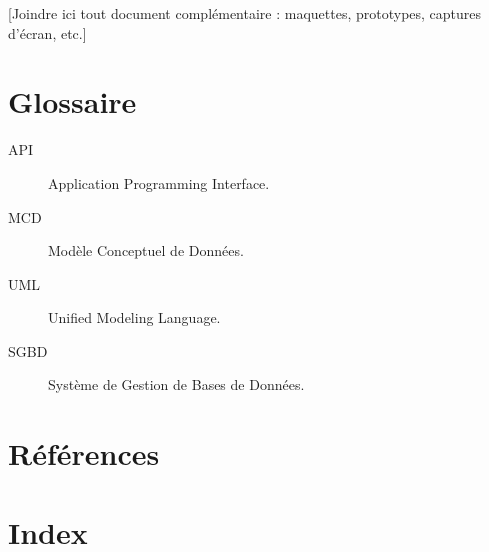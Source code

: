\documentclass[12pt, a4paper]{article}
\begin{document}
[Joindre ici tout document complémentaire : maquettes, prototypes, captures
d'écran, etc.]

\section{Glossaire}

\begin{description}
  \item[API] Application Programming Interface.
  \item[MCD] Modèle Conceptuel de Données.
  \item[UML] Unified Modeling Language.
  \item[SGBD] Système de Gestion de Bases de Données.
\end{description}

\section{Références}

\printbibliography[heading=none]

\section{Index}

\printindex
\end{document}
